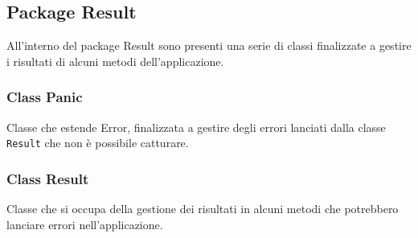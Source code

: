 \documentclass[a4paper, 12pt]{scrreprt}
\begin{document}
			\subsection{Package Result}
				All'interno del package Result sono presenti una serie di classi finalizzate a gestire i risultati di alcuni metodi dell'applicazione.

				\subsubsection{Class Panic}
				Classe che estende Error, finalizzata a gestire degli errori lanciati dalla classe \verb!Result! che non \`e possibile catturare.

				\subsubsection{Class Result}
				Classe che si occupa della gestione dei risultati in alcuni metodi che potrebbero lanciare errori nell'applicazione.\\
\end{document}
